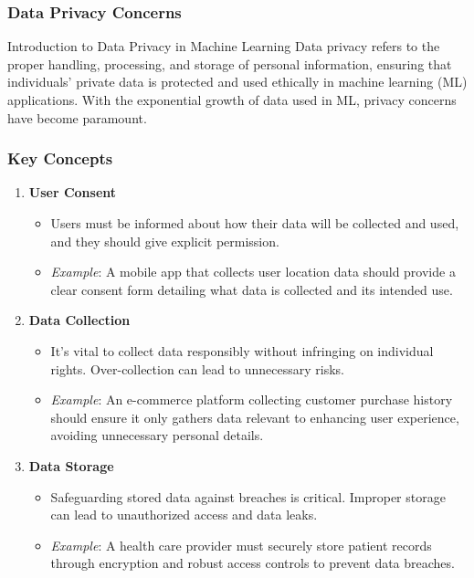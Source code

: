 \documentclass[aspectratio=169]{beamer}
\begin{document}
\begin{frame}[fragile]
    \frametitle{Data Privacy Concerns}
    \begin{block}{Introduction to Data Privacy in Machine Learning}
        Data privacy refers to the proper handling, processing, and storage of personal information, ensuring that individuals’ private data is protected and used ethically in machine learning (ML) applications. With the exponential growth of data used in ML, privacy concerns have become paramount.
    \end{block}
\end{frame}

\begin{frame}[fragile]
    \frametitle{Key Concepts}
    \begin{enumerate}
        \item \textbf{User Consent}
            \begin{itemize}
                \item Users must be informed about how their data will be collected and used, and they should give explicit permission.
                \item \textit{Example}: A mobile app that collects user location data should provide a clear consent form detailing what data is collected and its intended use.
            \end{itemize}
        
        \item \textbf{Data Collection}
            \begin{itemize}
                \item It's vital to collect data responsibly without infringing on individual rights. Over-collection can lead to unnecessary risks.
                \item \textit{Example}: An e-commerce platform collecting customer purchase history should ensure it only gathers data relevant to enhancing user experience, avoiding unnecessary personal details.
            \end{itemize}
        
        \item \textbf{Data Storage}
            \begin{itemize}
                \item Safeguarding stored data against breaches is critical. Improper storage can lead to unauthorized access and data leaks.
                \item \textit{Example}: A health care provider must securely store patient records through encryption and robust access controls to prevent data breaches.
            \end{itemize}
    \end{enumerate}
\end{frame}
\end{document}
